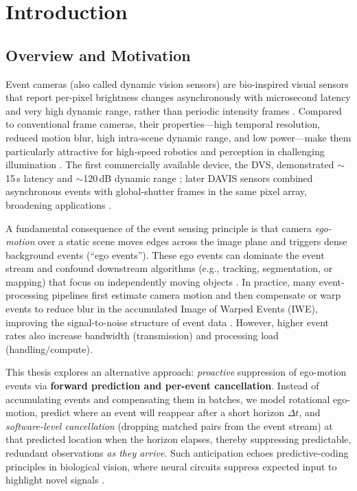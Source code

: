 \chapter{Introduction}

\section{Overview and Motivation}

Event cameras (also called dynamic vision sensors) are bio-inspired visual sensors that report per-pixel brightness changes asynchronously with microsecond latency and very high dynamic range, rather than periodic intensity frames \cite{Gallego2020Survey}. Compared to conventional frame cameras, their properties—high temporal resolution, reduced motion blur, high intra-scene dynamic range, and low power—make them particularly attractive for high-speed robotics and perception in challenging illumination \cite{Gallego2020Survey,Lichtsteiner2008DVS,Brandli2014DAVIS}. The first commercially available device, the DVS, demonstrated $\sim$15\,\textmu s latency and $\sim$120\,dB dynamic range \cite{Lichtsteiner2008DVS}; later DAVIS sensors combined asynchronous events with global-shutter frames in the same pixel array, broadening applications \cite{Brandli2014DAVIS}. 

A fundamental consequence of the event sensing principle is that camera \emph{ego-motion} over a static scene moves edges across the image plane and triggers dense background events (``ego events''). These ego events can dominate the event stream and confound downstream algorithms (e.g., tracking, segmentation, or mapping) that focus on independently moving objects \cite{Stoffregen2019Segmentation,Gallego2020Survey}. In practice, many event-processing pipelines first estimate camera motion and then compensate or warp events to reduce blur in the accumulated Image of Warped Events (IWE), improving the signal-to-noise structure of event data \cite{Gallego2018CMax,Bardow2016SOFIE}. However, higher event rates also increase bandwidth (transmission) and processing load (handling/compute).

This thesis explores an alternative approach: \emph{proactive} suppression of ego-motion events via \textbf{forward prediction and per-event cancellation}. Instead of accumulating events and compensating them in batches, we model rotational ego-motion, predict where an event will reappear after a short horizon $\Delta t$, and \emph{software-level cancellation} (dropping matched pairs from the event stream) at that predicted location when the horizon elapses, thereby suppressing predictable, redundant observations \emph{as they arrive}. Such anticipation echoes predictive-coding principles in biological vision, where neural circuits suppress expected input to highlight novel signals \cite{Hosoya2005RetinaPC,Rao1999V1PC}. 


